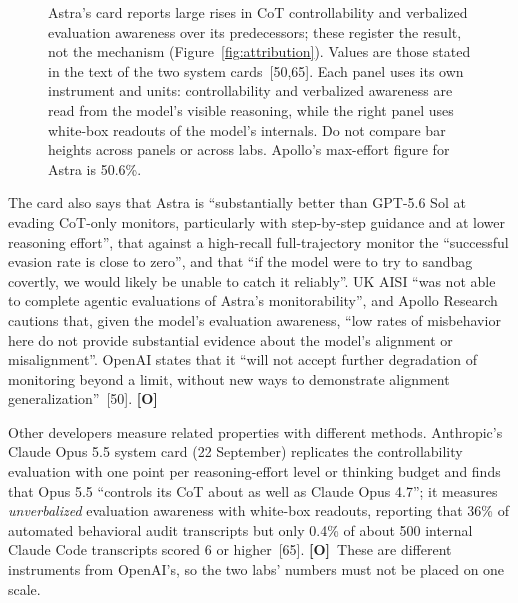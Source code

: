 \documentclass[11pt,letterpaper]{article}
\newcommand{\mO}{\textcolor{sensorteal}{\textbf{[O]}}}
\begin{document}
\begin{figure}[htbp]
\caption[Monitorability measurements from two system cards]{Astra's card reports large rises in CoT controllability and verbalized evaluation awareness over its predecessors; these register the result, not the mechanism (Figure~\ref{fig:attribution}). Values are those stated in the text of the two system cards~[50,65]. Each panel uses its own instrument and units: controllability and verbalized awareness are read from the model's visible reasoning, while the right panel uses white-box readouts of the model's internals. Do not compare bar heights across panels or across labs. Apollo's max-effort figure for Astra is 50.6\%.}
\label{fig:astracard}
\end{figure}

The card also says that Astra is ``substantially better than GPT-5.6 Sol at evading CoT-only monitors, particularly with step-by-step guidance and at lower reasoning effort'', that against a high-recall full-trajectory monitor the ``successful evasion rate is close to zero'', and that ``if the model were to try to sandbag covertly, we would likely be unable to catch it reliably''. UK AISI ``was not able to complete agentic evaluations of Astra's monitorability'', and Apollo Research cautions that, given the model's evaluation awareness, ``low rates of misbehavior here do not provide substantial evidence about the model's alignment or misalignment''. OpenAI states that it ``will not accept further degradation of monitoring beyond a limit, without new ways to demonstrate alignment generalization''~[50]. \mO

Other developers measure related properties with different methods. Anthropic's Claude Opus 5.5 system card (22 September) replicates the controllability evaluation with one point per reasoning-effort level or thinking budget and finds that Opus 5.5 ``controls its CoT about as well as Claude Opus 4.7''; it measures \emph{unverbalized} evaluation awareness with white-box readouts, reporting that 36\% of automated behavioral audit transcripts but only 0.4\% of about 500 internal Claude Code transcripts scored 6 or higher~[65]. \mO\ These are different instruments from OpenAI's, so the two labs' numbers must not be placed on one scale.
\end{document}
